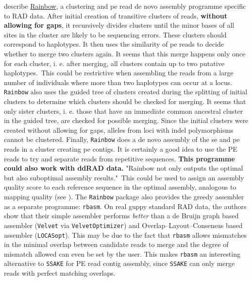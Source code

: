 \documentclass{article}\usepackage[]{graphicx}\usepackage[]{color}
\begin{document}
\cite{Chong2012} describe \href{https://sourceforge.net/projects/bio-rainbow/files/}{Rainbow}, a clustering and \gls{pe} read de novo assembly programme specific to RAD data. After initial creation of \gls{transitive clusters} of reads, \textbf{without allowing for gaps}, it recursively divides clusters until the minor bases of all sites in the cluster are likely to be sequencing errors.  These clusters should correspond to haplotypes. It then uses the similarity of \gls{pe} reads to decide whether to merge two clusters again. It seems that this merge happens only once for each cluster, i. e. after merging, all clusters contain up to two putative haplotypes.~This could be restrictive when assembling the reads from a large number of individuals where more than two haplotypes can occur at a locus. \texttt{Rainbow} also uses the guided tree of clusters created during the splitting of initial clusters to determine which clusters should be checked for merging. It seems that only sister clusters, i. e. those that have an immediate common ancestral cluster in the guided tree, are checked for possible merging. Since the initial clusters were created without allowing for gaps, alleles from loci with indel polymorphisms cannot be clustered. Finally, \texttt{Rainbow} does a de novo assembly of the \gls{se} and \gls{pe} reads in a cluster creating \gls{pe} contigs. It is certainly a good idea to use the PE reads to try and separate reads from repetitive sequences. \textbf{This programme could also work with ddRAD data.} "Rainbow not only outputs the optimal but also suboptimal assembly results."~This could be used to assign an assembly quality score to each reference sequence in the optimal assembly, analogous to mapping quality (see \citealt{Li2008}). The \texttt{Rainbow} package also provides the greedy assembler as a separate programme: \texttt{rbasm}. On real guppy standard RAD data, the authors show that their simple assembler performs \emph{better} than a de Bruijn graph based assembler (\texttt{Velvet} via \texttt{VelvetOptimizer}) and Overlap--Layout--Consensus based assembler (\texttt{LOCASopt}). This may be due to the fact that \texttt{rbasm} allows mismatches in the minimal overlap between candidate reads to merge and the degree of mismatch allowed can even be set by the user. This makes \texttt{rbasm} an interesting alternative to \texttt{SSAKE} for PE read contig assembly, since \texttt{SSAKE} can only merge reads with perfect matching overlaps.
\end{document}

